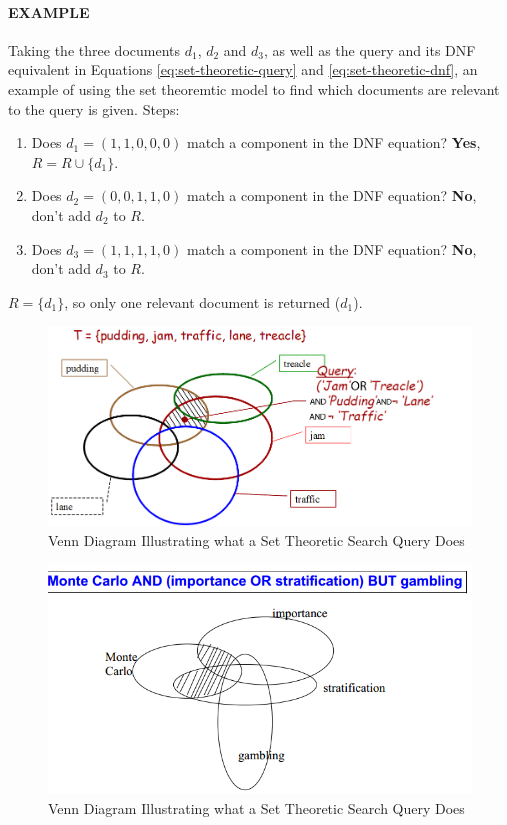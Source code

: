\documentclass{article}
\begin{document}
\paragraph{\textbf{EXAMPLE}} Taking the three documents $d_1$, $d_2$ and $d_3$, as well as the query and its DNF equivalent in Equations \ref{eq:set-theoretic-query} and \ref{eq:set-theoretic-dnf}, an example of using the set theoremtic model to find which documents are relevant to the query is given. Steps:
\begin{enumerate}
	\item Does $d_1 = (1, 1, 0, 0, 0)$ match a component in the DNF equation? \textbf{Yes}, $R = R \cup \lbrace d_1 \rbrace$.
	\item Does $d_2 = (0, 0, 1, 1, 0)$ match a component in the DNF equation? \textbf{No}, don't add $d_2$ to $R$.
	\item Does $d_3 = (1, 1, 1, 1, 0)$ match a component in the DNF equation? \textbf{No}, don't add $d_3$ to $R$.
\end{enumerate}
$R =  \lbrace d_1 \rbrace$, so only one relevant document is returned ($d_1$).

\begin{figure}[H]
	\centering
	\includegraphics[scale=0.3]{figures/ir-set-theoric-venn1.png}
	\caption{Venn Diagram Illustrating what a Set Theoretic Search Query Does}
	\label{fig:inverted-file-structure}
\end{figure}

\begin{figure}[H]
	\centering
	\includegraphics[scale=0.4]{figures/ir-set-theoric-venn2.png}
	\caption{Venn Diagram Illustrating what a Set Theoretic Search Query Does}
	\label{fig:inverted-file-structure}
\end{figure}
\end{document}

